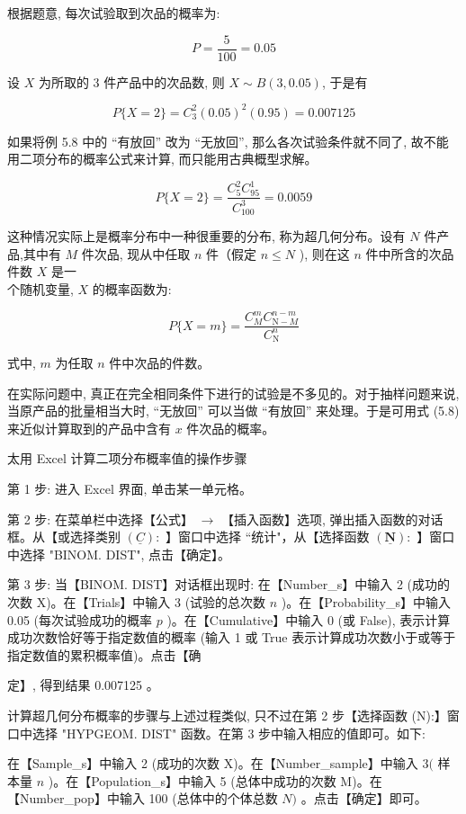 \documentclass[10pt]{article}
\begin{document}
\begin{CJK*}{UTF8}{bsmi}
根据题意, 每次试验取到次品的概率为:

$$
P=\frac{5}{100}=0.05
$$

设 $X$ 为所取的 3 件产品中的次品数, 则 $X \sim B(3,0.05)$, 于是有

$$
P\{X=2\}=C_{3}^{2}(0.05)^{2}(0.95)=0.007125
$$

如果将例 5.8 中的 “有放回” 改为 “无放回”, 那么各次试验条件就不同了, 故不能用二项分布的概率公式来计算, 而只能用古典概型求解。

$$
P\{X=2\}=\frac{C_{5}^{2} C_{95}^{1}}{C_{100}^{3}}=0.0059
$$

这种情况实际上是概率分布中一种很重要的分布, 称为超几何分布。设有 $N$ 件产品,其中有 $M$ 件次品, 现从中任取 $n$ 件（假定 $n \leqslant N$ ), 则在这 $n$ 件中所含的次品件数 $X$ 是一\\
个随机变量, $X$ 的概率函数为:


\begin{equation*}
P\{X=m\}=\frac{C_{M}^{m} C_{\mathrm{N}-M}^{n-m}}{C_{\mathrm{N}}^{n}} \tag{5.12}
\end{equation*}


式中, $m$ 为任取 $n$ 件中次品的件数。

在实际问题中, 真正在完全相同条件下进行的试验是不多见的。对于抽样问题来说,当原产品的批量相当大时, “无放回” 可以当做 “有放回” 来处理。于是可用式 (5.8) 来近似计算取到的产品中含有 $x$ 件次品的概率。

太用 Excel 计算二项分布概率值的操作步骤

第 1 步: 进入 Excel 界面, 单击某一单元格。

第 2 步: 在菜单栏中选择【公式】 $\rightarrow$ 【插入函数】选项, 弹出插入函数的对话框。从【或选择类别 $(\underline{C}):$ 】窗口中选择 “统计"，从【选择函数 $(\underline{\mathbf{N}}):$ 】窗口中选择 "BINOM. DIST", 点击【确定】。

第 3 步: 当【BINOM. DIST】对话框出现时: 在【Number\_s】中输入 2 (成功的次数 X)。在【Trials】中输入 3 (试验的总次数 $n$ )。在【Probability\_s】中输入 0.05 (每次试验成功的概率 $p$ )。在【Cumulative】中输入 0 (或 False), 表示计算成功次数恰好等于指定数值的概率 (输入 1 或 True 表示计算成功次数小于或等于指定数值的累积概率值)。点击【确

定】, 得到结果 0.007125 。

计算超几何分布概率的步骤与上述过程类似, 只不过在第 2 步【选择函数 (N):】窗口中选择 "HYPGEOM. DIST" 函数。在第 3 步中输入相应的值即可。如下:

在【Sample\_s】中输入 2 (成功的次数 X)。在【Number\_sample】中输入 $3($ 样本量 $n$ )。在【Population\_s】中输入 5 (总体中成功的次数 M)。在【Number\_pop】中输入 100 (总体中的个体总数 $N)$ 。点击【确定】即可。


\end{CJK*}
\end{document}
